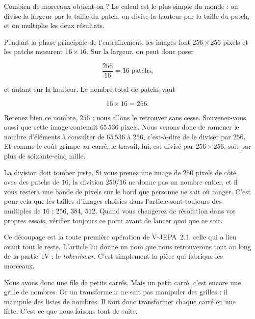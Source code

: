 Combien de morceaux obtient-on ? Le calcul est le plus simple du monde : on
divise la largeur par la taille du patch, on divise la hauteur par la taille
du patch, et on multiplie les deux résultats.

\begin{exemple}
Pendant la phase principale de l'entraînement, les images font
$256 \times 256$ pixels et les patchs mesurent $16 \times 16$. Sur la
largeur, on peut donc poser

\[
  \frac{256}{16} = 16 \text{ patchs,}
\]

et autant sur la hauteur. Le nombre total de patchs vaut

\[
  16 \times 16 = 256 .
\]

Retenez bien ce nombre, $256$ : nous allons le retrouver sans cesse.
Souvenez-vous aussi que cette image contenait $65\,536$ pixels. Nous venons
donc de ramener le nombre d'éléments à consulter de $65\,536$ à $256$,
c'est-à-dire de le diviser par $256$. Et comme le coût grimpe au carré, le
travail, lui, est divisé par $256 \times 256$, soit par plus de soixante-cinq
mille.
\end{exemple}

\begin{piege}
La division doit tomber juste. Si vous prenez une image de $250$ pixels de
côté avec des patchs de $16$, la division $250/16$ ne donne pas un nombre
entier, et il vous restera une bande de pixels sur le bord que personne ne
sait où ranger. C'est pour cela que les tailles d'images choisies dans
l'article sont toujours des multiples de $16$ : $256$, $384$, $512$. Quand
vous changerez de résolution dans vos propres essais, vérifiez toujours ce
point avant de lancer quoi que ce soit.
\end{piege}

\begin{enia}
Ce découpage est la toute première opération de V-JEPA~2.1, celle qui a lieu
avant tout le reste. L'article lui donne un nom que nous retrouverons tout
au long de la partie~IV : le \emph{tokeniseur}. C'est simplement la pièce
qui fabrique les morceaux.
\end{enia}

Nous avons donc une file de petits carrés. Mais un petit carré, c'est encore
une grille de nombres. Or un transformeur ne sait pas manipuler des grilles :
il manipule des listes de nombres. Il faut donc transformer chaque carré en
une liste. C'est ce que nous faisons tout de suite.

